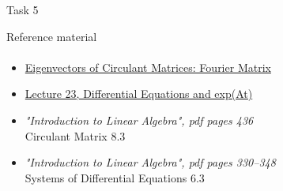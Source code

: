 \documentclass[aspectratio=169]{beamer}
\newcommand{\fbckg}[1]{\usebackgroundtemplate{\texttt{[image: \#1]}}}%
\begin{document}
\begin{frame}[t]{Task 5}
{\begin{enumerate}
        \end{enumerate}
    }
\end{frame}

\begin{frame}[t]{Reference material}
    \framesubtitle{}
    \Large
    \begin{itemize}
        \item \href{https://youtu.be/1pFv7e9xtHo}{Eigenvectors of Circulant Matrices: Fourier Matrix} \label{itm:circulant}
        \item \href{https://www.youtube.com/watch?v=IZqwi0wJovM&list=PL49CF3715CB9EF31D&index=23}{Lecture 23, Differential Equations and exp(At)}
        \item \textit{"Introduction to Linear Algebra", pdf pages 436 }\\ Circulant Matrix 8.3
        \item \textit{"Introduction to Linear Algebra", pdf pages 330--348 }\\ Systems of Differential Equations 6.3
    \end{itemize}
\end{frame}

\fbckg{fibeamer/figs/last_page.png}
\frame[plain]{}
\end{document}
